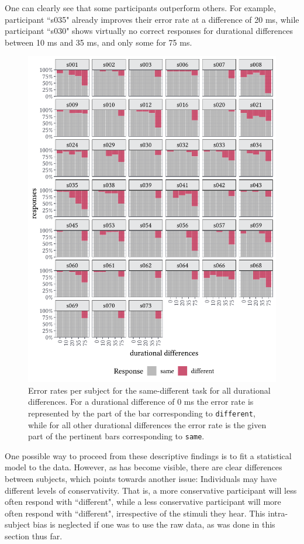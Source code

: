 One can clearly see that some participants outperform others. For example, participant ``s035" already improves their error rate at a difference of 20 ms, while participant ``s030" shows virtually no correct responses for durational differences between 10 ms and 35 ms, and only some for 75 ms.

\begin{figure}
    \centering
    \includegraphics[]{figures/fig6.3.pdf}
    \caption{Error rates per subject for the same-different task for all durational differences. For a durational difference of 0 ms the error rate is represented by the part of the bar corresponding to \texttt{different}, while for all other durational differences the error rate is the given part of the pertinent bars corresponding to \texttt{same}.}
    \label{fig:6_3}
\end{figure}

One possible way to proceed from these descriptive findings is to fit a statistical model to the data. However, as has become visible, there are clear differences between subjects, which points towards another issue: Individuals may have different levels of conservativity. That is, a more conservative participant will less often respond with ``different", while a less conservative participant will more often respond with ``different", irrespective of the stimuli they hear. This intra-subject bias is neglected if one was to use the raw data, as was done in this section thus far.

